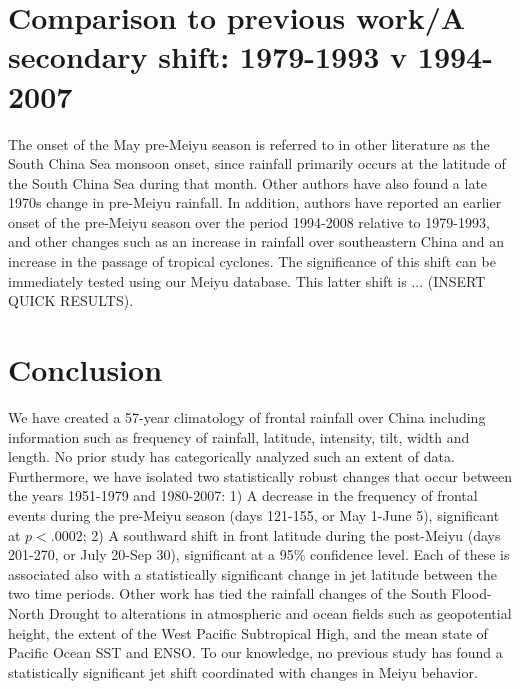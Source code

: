 \documentclass[draft,grl]{AGUTeX}
\begin{document}
\begin{article}
\section{Comparison to previous work/A secondary shift: 1979-1993 v 1994-2007}

	The onset of the May pre-Meiyu season is referred to in other literature as the South China Sea monsoon onset, since rainfall primarily occurs at the latitude of the South China Sea during that month. Other authors have also found a late 1970s change in pre-Meiyu rainfall\citep{Wang2009}. In addition, authors have reported an earlier onset of the pre-Meiyu season over the period 1994-2008 relative to 1979-1993\citep{Kajikawa2012}, and other changes such as an increase in rainfall over southeastern China and an increase in the passage of tropical cyclones\citep{Kwon2007}. The significance of this shift can be immediately tested using our Meiyu database. This latter shift is ... (INSERT QUICK RESULTS).

\section{Conclusion}

We have created a 57-year climatology of frontal rainfall over China including information such as frequency of rainfall, latitude, intensity, tilt, width and length. No prior study has categorically analyzed such an extent of data. Furthermore, we have isolated two statistically robust changes that occur between the years 1951-1979 and 1980-2007: 1) A decrease in the frequency of frontal events during the pre-Meiyu season (days 121-155, or May 1-June 5), significant at $p < .0002$; 2) A southward shift in front latitude during the post-Meiyu (days 201-270, or July 20-Sep 30), significant at a 95\% confidence level. Each of these is associated also with a statistically significant change in jet latitude between the two time periods. Other work has tied the rainfall changes of the South Flood-North Drought to alterations in atmospheric and ocean fields such as geopotential height, the extent of the West Pacific Subtropical High, and the mean state of Pacific Ocean SST and ENSO\citep{Chang2000}. To our knowledge, no previous study has found a statistically significant jet shift coordinated with changes in Meiyu behavior.


\end{article}
\end{document}
